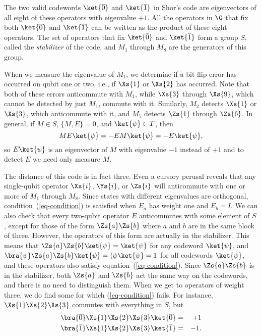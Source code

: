 The two valid codewords $\ket{\overline{0}}$ and $\ket{\overline{1}}$ in
Shor's code are eigenvectors of all eight of these operators with eigenvalue
$+1$.  All the operators in $\G$ that fix both $\ket{\overline{0}}$ and
$\ket{\overline{1}}$ can be written as the product of these eight operators.
The set of operators that fix $\ket{\overline{0}}$ and $\ket{\overline{1}}$
form a group $S$, called the {\em stabilizer} of the code, and $M_1$
through $M_8$ are the generators of this group.

When we measure the eigenvalue of $M_1$, we determine if a bit flip
error has occurred on qubit one or two, i.e., if $\Xs{1}$ or $\Xs{2}$ has
occurred.  Note that both of these errors anticommute with $M_1$, while
$\Xs{3}$ through $\Xs{9}$, which cannot be detected by just $M_1$, commute
with it.  Similarly, $M_2$ detects $\Xs{1}$ or $\Xs{3}$, which anticommute
with it, and $M_7$ detects $\Zs{1}$ through $\Zs{6}$.  In general, if
$M \in S$, $\{M, E\} = 0$, and $\ket{\psi} \in T$, then
\begin{equation}
	M E \ket{\psi} = - E M \ket{\psi} = - E \ket{\psi},
\end{equation}
so $E \ket{\psi}$ is an eigenvector of $M$ with eigenvalue $-1$ instead of
$+1$ and to detect $E$ we need only measure $M$.

The distance of this code is in fact three.  Even a cursory perusal reveals
that any single-qubit operator $\Xs{i}$, $\Ys{i}$, or $\Zs{i}$ will anticommute
with one or more of $M_1$ through $M_8$.  Since states with different
eigenvalues are orthogonal, condition~(\ref{eq-condition}) is satisfied when
$E_a$ has weight one and $E_b = I$.  We can also check that every two-qubit
operator $E$ anticommutes with some element of $S$, except for those of
the form $\Zs{a} \Zs{b}$ where $a$ and $b$ are in the same block of three.
However, the operators of this form are actually in the stabilizer.  This means
that $\Zs{a} \Zs{b} \ket{\psi} = \ket{\psi}$ for any codeword $\ket{\psi}$, and
$\bra{\psi} \Zs{a} \Zs{b} \ket{\psi} = \langle \psi \ket{\psi} = 1$ for all
codewords $\ket{\psi}$, and these operators also satisfy
equation~(\ref{eq-condition}).  Since $\Zs{a} \Zs{b}$ is in the stabilizer,
both $\Zs{a}$ and $\Zs{b}$ act the same way on the codewords, and there is no
need to distinguish them.  When we get to operators of weight three, we do
find some for which (\ref{eq-condition}) fails.  For instance, $\Xs{1} \Xs{2}
\Xs{3}$ commutes with everything in $S$, but
\begin{eqnarray}
	\bra{\overline{0}} \Xs{1} \Xs{2} \Xs{3} \ket{\overline{0}} & = & +1 \\
	\bra{\overline{1}} \Xs{1} \Xs{2} \Xs{3} \ket{\overline{1}} & = & -1.
\end{eqnarray}

